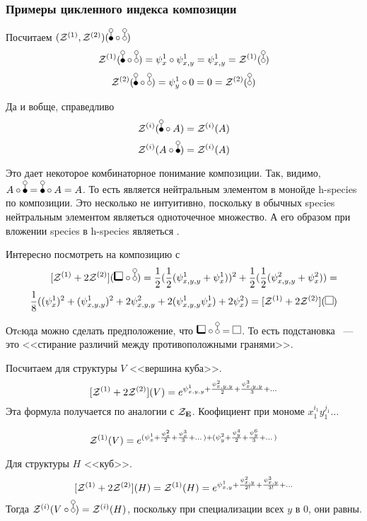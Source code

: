 \subsubsection{Примеры цикленного индекса композиции}
\begin{example}
Посчитаем $(\Zone, \Ztwo)(\dB \circ \dA)$
$$
\Zone(\dB \circ \dA) = \psi_{x}^1 \circ \psi_{x, y}^1 = \psi_{x, y}^1
= \Zone(\dA)
$$ 
$$
\Ztwo(\dB \circ \dA) = \psi_{y}^1 \circ 0 = 0 = \Ztwo(\dA)
$$
\end{example}
\begin{example}
Да и вобще, справедливо
$$
\Zi(\dB \circ A) = \Zi(A)
$$ 
$$
\Zi(A \circ \dB) = \Zi(A)
$$
\end{example}
\begin{remark}
Это дает некоторое комбинаторное понимание композиции. Так, видимо, $A \circ \dB
= \dB \circ A = A$. То есть \dB является нейтральным элементом в монойде h-species по
композиции.
Это несколько не интуитивно, поскольку в обычных species нейтральным
элементом являеться одноточечное множество. А его образом при вложении species в
h-species являеться \dA.
\end{remark}
\begin{example}
Интересно посмотреть на композицию с \dA
\begin{equation}
\begin{split}
\Zfull(\dBB \circ \dA) = \frac{1}{2} (\frac{1}{2}(\psi_{x,y,y}^1 +
\psi_{x}^1))^2 + \frac{1}{2} (\frac{1}{2}(\psi_{x,y,y}^2 +
\psi_{x}^2)) = \\
\frac{1}{8}((\psi_{x}^1)^2 + (\psi_{x, y, y}^1)^2 +
2\psi_{x, y, y}^2 + 2(\psi_{x, y, y}^1\psi_{x}^1) + 2\psi_{x}^2) =
\Zfull(\dAA)
\end{split}
\end{equation}
\begin{remark}
Отcюда можно сделать предположение, что $\dBB \circ \dA = \dAA$.
То есть подстановка \dA~--- это <<стирание различий между противоположными
гранями>>.
\end{remark}
\end{example}
\begin{example}
Посчитаем для структуры $V$ <<вершина куба>>.
$$
[\mathcal Z^{(1)} + 2\mathcal Z^{(2)}](V) = e^{\psi_{x,y,y}^{1} + \frac{\psi_{x,y,y}^{2}}{2} +
\frac{\psi_{x,y,y}^{3}}{3} + \dots} 
$$
Эта формула получается по аналогии с $\mathcal Z_{\mathbf E}$. Коофициент при мономе
$x_1^{i_1}y_1^{j_1}\ldots$

$$
\mathcal Z^{(1)}(V) = e^{(\psi_{x}^{1} + \frac{\psi_{x}^{2}}{2} +
\frac{\psi_{x}^{3}}{3} + \dots) + (\psi_{y}^{2} + \frac{\psi_{y}^{4}}{2} +
\frac{\psi_{y}^{6}}{3} + \dots)} 
$$

Для структуры $H$ <<куб>>.
$$
[\mathcal Z^{(1)} + 2\mathcal Z^{(2)}](H) = \mathcal Z^{(1)}(H) = e^{\psi_{x,y}^{1} +
\frac{\psi_{x,y}^{2}}{2!} + \frac{\psi_{x,y}^{3}}{3!} + \dots} 
$$
Тогда $\Zi(V \circ \dA) = \Zi(H)$, поскольку
при специализации всех $y$ в $0$, они равны.
\end{example}

